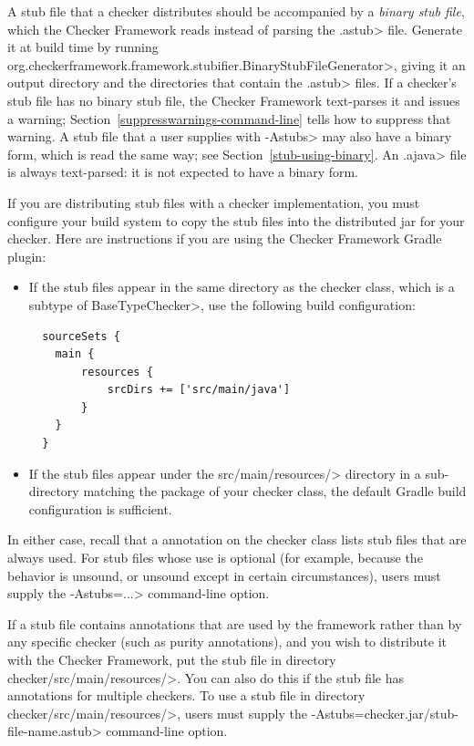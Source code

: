 A stub file that a checker distributes should be accompanied by a \emph{binary
stub file}, which the Checker Framework reads instead of parsing the \<.astub>
file.  Generate it at build time by running
\<org.checkerframework.framework.stubifier.BinaryStubFileGenerator>, giving it an
output directory and the directories that contain the \<.astub> files.  If a
checker's stub file has no binary stub file, the Checker Framework text-parses
it and issues a warning; Section~\ref{suppresswarnings-command-line} tells how to
suppress that warning.  A stub file that a user supplies with \<-Astubs> may
also have a binary form, which is read the same way; see
Section~\ref{stub-using-binary}.  An \<.ajava> file is always text-parsed: it
is not expected to have a binary form.

If you are distributing stub files with a checker implementation, you must
configure your build system to copy the stub files into the distributed jar for
your checker.  Here are instructions if you are using the Checker Framework
Gradle plugin:
\begin{itemize}
\item
  If the stub files appear in the same directory as the checker class, which is
  a subtype of \<BaseTypeChecker>, use the following build configuration:
\begin{Verbatim}
  sourceSets {
    main {
        resources {
            srcDirs += ['src/main/java']
        }
    }
  }
\end{Verbatim}
\item
  If the stub files appear under the \<src/main/resources/>
  directory in a sub-directory matching the package of your checker class,
  the default Gradle build configuration is sufficient.
\end{itemize}
In either case, recall that a 
annotation on the checker class lists stub files that are always used.  For
stub files whose use is optional (for example, because the behavior is
unsound, or unsound except in certain circumstances), users must supply the
\<-Astubs=...> command-line option.


If a stub file contains annotations that are used by the framework rather
than by any specific checker (such as purity annotations), and you wish to
distribute it with the Checker Framework, put the stub file in directory
\<checker/src/main/resources/>.  You can also do this if the stub file has
annotations for multiple checkers.  To use a stub file in directory
\<checker/src/main/resources/>, users must supply the
\<-Astubs=checker.jar/stub-file-name.astub> command-line option.


